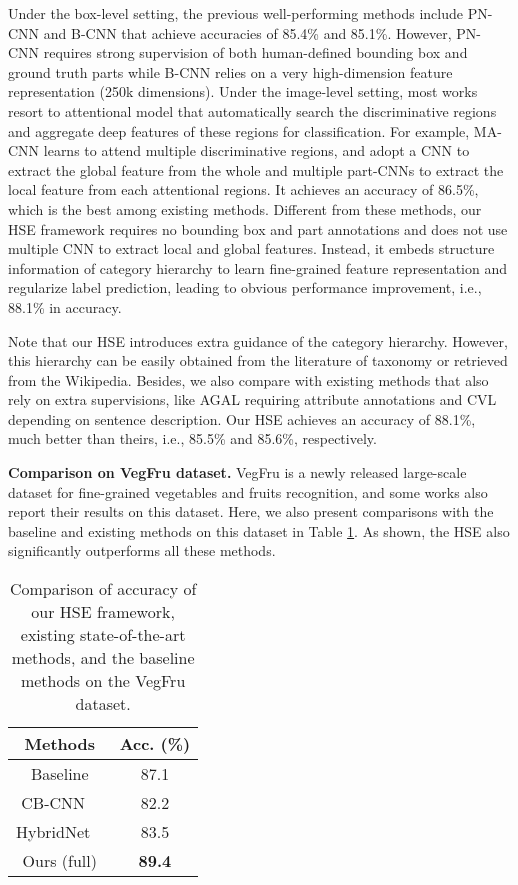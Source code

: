 \documentclass[sigconf]{acmart}
\begin{document}
Under the box-level setting, the previous well-performing methods include PN-CNN and B-CNN that achieve accuracies of 85.4\% and 85.1\%. However, PN-CNN requires strong supervision of both human-defined bounding box and ground truth parts while B-CNN relies on a very high-dimension feature representation (250k dimensions). Under the image-level setting, most works resort to attentional model that automatically search the discriminative regions and aggregate deep features of these regions for classification. For example, MA-CNN learns to attend multiple discriminative regions, and adopt a CNN to extract the global feature from the whole and multiple part-CNNs to extract the local feature from each attentional regions. It achieves an accuracy of 86.5\%, which is the best among existing methods. Different from these methods, our HSE framework requires no bounding box and part annotations and does not use multiple CNN to extract local and global features. Instead, it embeds structure information of category hierarchy to learn fine-grained feature representation and regularize label prediction, leading to obvious performance improvement, i.e., 88.1\% in accuracy. 

Note that our HSE introduces extra guidance of the category hierarchy. However, this hierarchy can be easily obtained from the literature of taxonomy or retrieved from the Wikipedia. Besides, we also compare with existing methods that also rely on extra supervisions, like AGAL requiring attribute annotations and CVL depending on sentence description. Our HSE achieves an accuracy of 88.1\%, much better than theirs, i.e., 85.5\% and 85.6\%, respectively.

\noindent\textbf{Comparison on VegFru dataset. }VegFru is a newly released large-scale dataset for fine-grained vegetables and fruits recognition, and some works also report their results on this dataset. Here, we also present comparisons with the baseline and existing methods on this dataset in Table \ref{table:vegfru}. As shown, the HSE also significantly outperforms all these methods.


\begin{table}[htp]
\centering
\begin{tabular}{c|c}
\hline
\centering  Methods  & Acc. (\%) \\
\hline
\hline
Baseline & 87.1  \\
\hline
\hline
CB-CNN ~\cite{gao2016compact} & 82.2 \\
HybridNet ~\cite{hou2017vegfru} & 83.5 \\
\hline
\hline
Ours (full)  & \textbf{89.4} \\
\hline
\end{tabular}
\caption{Comparison of accuracy of our HSE framework, existing state-of-the-art methods, and the baseline methods on the VegFru dataset. }
\label{table:vegfru}
\end{table}
\end{document}
